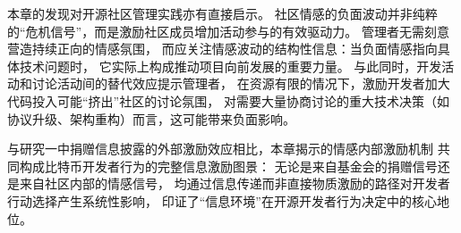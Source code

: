 本章的发现对开源社区管理实践亦有直接启示。
社区情感的负面波动并非纯粹的“危机信号”，而是激励社区成员增加活动参与的有效驱动力。
管理者无需刻意营造持续正向的情感氛围，
而应关注情感波动的结构性信息：当负面情感指向具体技术问题时，
它实际上构成推动项目向前发展的重要力量。
与此同时，开发活动和讨论活动间的替代效应提示管理者，
在资源有限的情况下，激励开发者加大代码投入可能“挤出”社区的讨论氛围，
对需要大量协商讨论的重大技术决策（如协议升级、架构重构）而言，这可能带来负面影响。

与研究一中捐赠信息披露的外部激励效应相比，本章揭示的情感内部激励机制
共同构成比特币开发者行为的完整信息激励图景：
无论是来自基金会的捐赠信号还是来自社区内部的情感信号，
均通过信息传递而非直接物质激励的路径对开发者行动选择产生系统性影响，
印证了“信息环境”在开源开发者行为决定中的核心地位。



